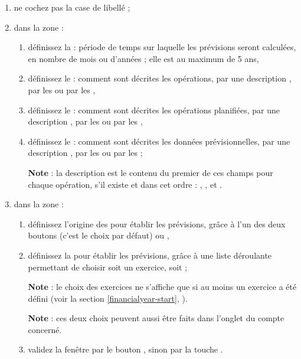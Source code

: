 \begin{enumerate}
	\item ne cochez pas la case de libellé  ;	 
	\item dans la zone  :	
		\begin{enumerate}	
			\item définissez la  : période de temps sur laquelle les prévisions seront calculées, en nombre de mois ou d'années ; elle est au maximum de 5 ans, 
			\item définissez le  : comment sont décrites les opérations, par une description , par les  ou par les ,
			\item définissez le  : comment sont décrites les opérations planifiées, par une description , par les  ou par les ,		
			\item définissez le  : comment sont décrites les données prévisionnelles, par une description , par les  ou par les  ; %
			
			\textbf{Note} : la description  est le contenu du premier de ces champs pour chaque opération, s'il existe et dans cet ordre : , ,  et .
		\end{enumerate}			
	\item dans la zone  :
		\begin{enumerate}	
			\item définissez l'origine des  pour établir les prévisions, grâce à l'un des deux boutons  (c'est le choix par défaut) ou ,
			\item définissez la  pour établir les prévisions, grâce à une liste déroulante permettant de choisir soit un exercice, soit  ; %
			
			\textbf{Note} : le choix des exercices ne s'affiche que si au moins un exercice a été défini (voir la section \vref{financialyear-start}, ). %
			
			\textbf{Note} : ces deux choix peuvent aussi être faits dans l'onglet  du compte concerné.
			\item validez la fenêtre par le bouton , sinon par la touche .	
		\end{enumerate}
\end{enumerate}


